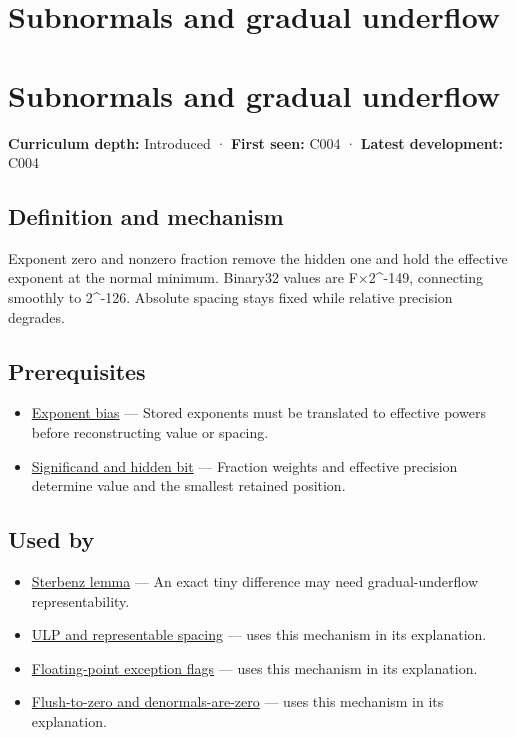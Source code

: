 \hypertarget{appendix-00a6e044c437}{}
\section*{Subnormals and gradual underflow}
\section{Subnormals and gradual underflow}\label{appendix-00a6e044c437-subnormals-and-gradual-underflow}

\textbf{Curriculum depth:} Introduced · \textbf{First seen:} C004 · \textbf{Latest development:} C004

\subsection{Definition and mechanism}\label{appendix-00a6e044c437-definition-and-mechanism}

Exponent zero and nonzero fraction remove the hidden one and hold the effective exponent at the normal minimum. Binary32 values are F×2\^{}-149, connecting smoothly to 2\^{}-126. Absolute spacing stays fixed while relative precision degrades.

\subsection{Prerequisites}\label{appendix-00a6e044c437-prerequisites}

\begin{itemize}
\tightlist
\item
  \hyperref[appendix-2fae058c82e1]{Exponent bias} --- Stored exponents must be translated to effective powers before reconstructing value or spacing.
\item
  \hyperref[appendix-a24fd710cf67]{Significand and hidden bit} --- Fraction weights and effective precision determine value and the smallest retained position.
\end{itemize}

\subsection{Used by}\label{appendix-00a6e044c437-used-by}

\begin{itemize}
\item
  \hyperref[appendix-399b7ad53f39]{Sterbenz lemma} --- An exact tiny difference may need gradual-underflow representability.
\item
  \hyperref[appendix-14bab4cab9d4]{ULP and representable spacing} --- uses this mechanism in its explanation.
\item
  \hyperref[appendix-ed8531b46754]{Floating-point exception flags} --- uses this mechanism in its explanation.
\item
  \hyperref[appendix-e979eb012782]{Flush-to-zero and denormals-are-zero} --- uses this mechanism in its explanation.
\end{itemize}

